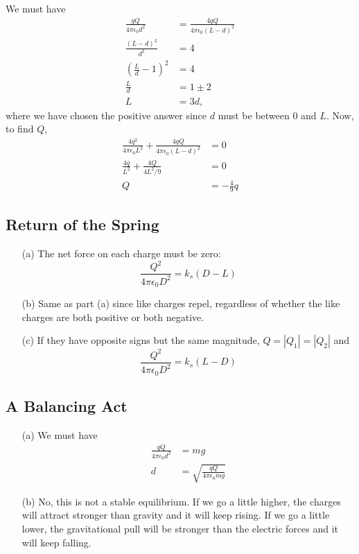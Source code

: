 \documentclass{article}
\begin{document}
We must have
\begin{align*}
\frac{qQ}{4\pi\epsilon_0 d^2} &= \frac{4qQ}{4\pi\epsilon_0 (L-d)^2} \\
\frac{(L-d)^2}{d^2} &= 4 \\
\left(\frac{L}{d}-1\right)^2 &= 4 \\
\frac{L}{d} &= 1\pm 2 \\
L &= 3d,
\end{align*}
where we have chosen the positive answer since $d$ must be between $0$ and $L$. Now, to find $Q$,
\begin{align*}
\frac{4q^2}{4\pi\epsilon_0 L^2} + \frac{4qQ}{4\pi\epsilon_0 (L-d)^2} &= 0 \\
\frac{4q}{L^2} + \frac{4Q}{4L^2/9} &= 0 \\
Q &= - \frac{4}{9}q
\end{align*}

\newpage

\subsection{Return of the Spring}

\begin{itemize}
	\item[(a)] The net force on each charge must be zero:
	\begin{equation}
	\frac{Q^2}{4\pi\epsilon_0 D^2} = k_s (D-L)
	\end{equation}
	\item[(b)] Same as part (a) since like charges repel, regardless of whether the like charges are both positive or both negative.
	\item[(c)] If they have opposite signs but the same magnitude, $Q = |Q_1| = |Q_2|$ and
	\begin{equation}
	\frac{Q^2}{4\pi\epsilon_0 D^2} = k_s (L-D)
	\end{equation}
\end{itemize}

\newpage

\subsection{A Balancing Act}

\begin{itemize}
	\item[(a)] We must have
	\begin{align*}
	\frac{qQ}{4\pi\epsilon_0 d^2} &= mg \\
	d &= \sqrt{\frac{qQ}{4\pi\epsilon_0 mg}}
	\end{align*}
	\item[(b)] No, this is not a stable equilibrium. If we go a little higher, the charges will attract stronger than gravity and it will keep rising. If we go a little lower, the gravitational pull will be stronger than the electric forces and it will keep falling.
\end{itemize}
\end{document}
